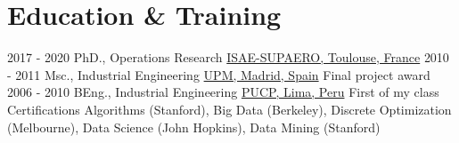 \documentclass[letterpaper]{twentysecondcv} %
\begin{document}
\section{Education \& Training}

\begin{twenty} %
  \twentyitemshorttest
      {2017 - 2020}
        {}
        {PhD., Operations Research}
        {\href{https://www.isae-supaero.fr/en/}{ISAE-SUPAERO, Toulouse, France}}
        {}   
  \twentyitemshorttest
      {2010 - 2011}
    {}
        {Msc., Industrial Engineering}
        {\href{https://www.upm.es/internacional}{UPM, Madrid, Spain}}
        {Final project award}
  \twentyitemshorttest
      {2006 - 2010}
    {}
        {BEng., Industrial Engineering}
        {\href{https://www.pucp.edu.pe/}{PUCP, Lima, Peru}}
        {First of my class}
  \\
  \twentyitemshorttest
      {Certifications}
    {}
        {Algorithms (Stanford), Big Data (Berkeley), Discrete Optimization (Melbourne), Data Science (John Hopkins), Data Mining (Stanford)}
        {}
        {}

\end{twenty}
\end{document}
